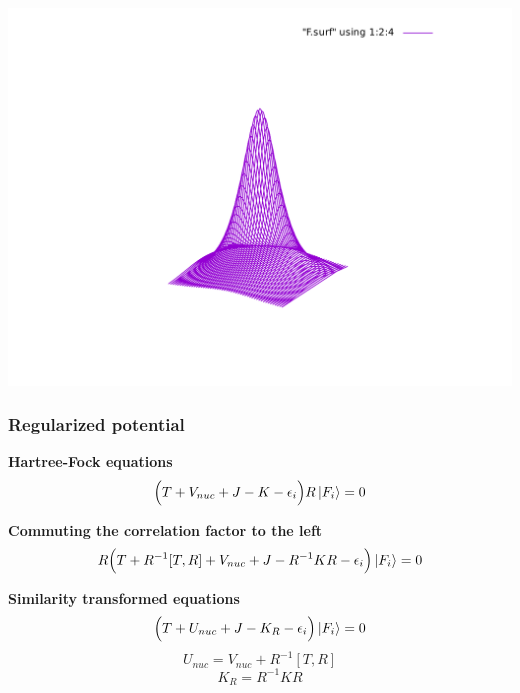 \begin{frame}
\includegraphics[scale=0.35, viewport = 175 90 430 400, clip]{figures/F.pdf}\\
\end{frame}

\begin{frame}
\frametitle{Regularized potential}
\centering

\textbf{Hartree-Fock equations}
\begin{equation}
    \nonumber
    \Big(T + V_{nuc} + J - K - \epsilon_i\Big)R\ket{F_i} = 0
\end{equation}

\vspace{5mm}

\pause
\textbf{Commuting the correlation factor to the left}
\begin{equation}
    \nonumber
    R\Big(T + R^{-1}[T,R] + V_{nuc} + J - R^{-1}KR - \epsilon_i\Big)\ket{F_i} = 0
\end{equation}

\vspace{5mm}

\pause
\textbf{Similarity transformed equations}
\begin{equation}
    \nonumber
    \Big(T + U_{nuc} + J - K_R - \epsilon_i\Big)\ket{F_i} = 0
\end{equation}
\begin{equation}
    \nonumber
    U_{nuc} = V_{nuc} + R^{-1}[T,R]
\end{equation}
\begin{equation}
    \nonumber
    K_R = R^{-1}KR
\end{equation}

\end{frame}

